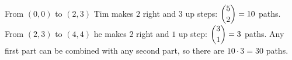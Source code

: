 From $(0,0)$ to $(2,3)$ Tim makes $2$ right and $3$ up steps: $\dbinom{5}{2}=10$ paths. From $(2,3)$ to $(4,4)$ he makes $2$ right and $1$ up step: $\dbinom31=3$ paths. Any first part can be combined with any second part, so there are $10\cdot3=\boxed{30}$ paths.
